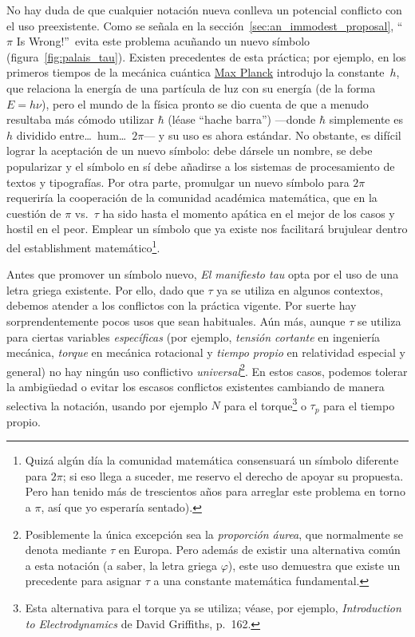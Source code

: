 No hay duda de que cualquier notación nueva conlleva un potencial conflicto con el uso preexistente. Como se señala en la sección~\ref{sec:an_immodest_proposal}, ``$\pi$ Is Wrong!''\ evita este problema acuñando un nuevo símbolo (figura~\ref{fig:palais_tau}). Existen precedentes de esta práctica; por ejemplo, en los primeros tiempos de la mecánica cuántica \href{https://es.wikipedia.org/wiki/Max_Planck}{Max Planck} introdujo la constante~$h$, que relaciona la energía de una partícula de luz con su energía (de la forma $E = h\nu$), pero el mundo de la física pronto se dio cuenta de que a menudo resultaba más cómodo utilizar $\hbar$ (léase ``hache barra'') ---donde $\hbar$ simplemente es $h$ dividido entre\ldots\ hum\ldots\ $2\pi$--- y su uso es ahora estándar. No obstante, es difícil lograr la aceptación de un nuevo símbolo: debe dársele un nombre, se debe popularizar y el símbolo en sí debe añadirse a los sistemas de procesamiento de textos y tipografías. Por otra parte, promulgar un nuevo símbolo para $2\pi$ requeriría la cooperación de la comunidad académica matemática, que en la cuestión de $\pi$ vs.\ $\tau$ ha sido hasta el momento apática en el mejor de los casos y hostil en el peor. Emplear un símbolo que ya existe nos facilitará brujulear dentro del establishment matemático\footnote{Quizá algún día la comunidad matemática consensuará un símbolo diferente para $2\pi$; si eso llega a suceder, me reservo el derecho de apoyar su propuesta. Pero han tenido más de trescientos años para arreglar este problema en torno a $\pi$, así que yo esperaría sentado).}.

Antes que promover un símbolo nuevo, \emph{El manifiesto tau} opta por el uso de una letra griega existente. Por ello, dado que $\tau$ ya se utiliza en algunos contextos, debemos atender a los conflictos con la práctica vigente. Por suerte hay sorprendentemente pocos usos que sean habituales. Aún más, aunque $\tau$ se utiliza para ciertas variables \emph{específicas} (por ejemplo, \emph{tensión cortante} en ingeniería mecánica, \emph{torque} en mecánica rotacional y  \emph{tiempo propio} en relatividad especial y general) no hay ningún uso conflictivo \emph{universal}\footnote{Posiblemente la única excepción sea la \emph{proporción áurea}, que normalmente se denota mediante $\tau$ en Europa. Pero además de existir una alternativa común a esta notación (a saber, la letra griega $\varphi$), este uso demuestra que existe un precedente para asignar $\tau$ a una constante matemática fundamental.}. En estos casos, podemos tolerar la ambigüedad o evitar los escasos conflictos existentes cambiando de manera selectiva la notación, usando por ejemplo $N$ para el torque\footnote{Esta alternativa para el torque ya se utiliza; véase, por ejemplo, \emph{Introduction to Electrodynamics} de David Griffiths, p.~162.} o $\tau_p$ para el tiempo propio.

